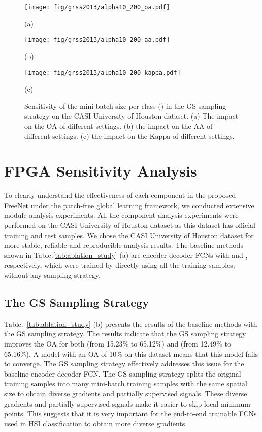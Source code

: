 \documentclass[journal]{IEEEtran}
\begin{document}
\begin{figure*}[htb]
  \begin{minipage}[b]{.32\linewidth}
    \centering
    \texttt{[image: fig/grss2013/alpha10\_200\_oa.pdf]}
    \centerline{(a)}
  \end{minipage}
  \hfill
  \begin{minipage}[b]{0.32\linewidth}
    \centering
    \texttt{[image: fig/grss2013/alpha10\_200\_aa.pdf]}
    \centerline{(b)}
  \end{minipage}
  \hfill
  \begin{minipage}[b]{0.32\linewidth}
    \centering
    \texttt{[image: fig/grss2013/alpha10\_200\_kappa.pdf]}
    \centerline{(c)}
  \end{minipage}
  \caption{Sensitivity of the mini-batch size per class () in the GS sampling strategy on the CASI University of Houston dataset.
    (a) The impact on the OA of different  settings.
    (b) the impact on the AA of different  settings.
    (c) the impact on the Kappa of different  settings.}
  \label{fig:alpha}
\end{figure*}






\section{FPGA Sensitivity Analysis}
To clearly understand the effectiveness of each component in the proposed FreeNet under the patch-free global learning framework, we conducted extensive module analysis experiments.
All the component analysis experiments were performed on the CASI University of Houston dataset as this dataset has official training and test samples.
We chose the CASI University of Houston dataset for more stable, reliable and reproducible analysis results.
The baseline methods shown in Table.\ref{tab:ablation_study} (a) are encoder-decoder FCNs with  and , respectively, which were trained by directly using all the training samples, without any sampling strategy.
\subsection{\textbf{The GS Sampling Strategy}}
\label{sec:gs2}
Table.~\ref{tab:ablation_study} (b) presents the results of the baseline methods with the GS sampling strategy.
The results indicate that the GS sampling strategy improves the OA for both  (from 15.23\% to 65.12\%) and  (from 12.49\% to 65.16\%).
A model with an OA of 10\% on this dataset means that this model fails to converge.
The GS sampling strategy effectively addresses this issue for the baseline encoder-decoder FCN.
The GS sampling strategy splits the original training samples into many mini-batch training samples with the same spatial size to obtain diverse gradients and partially supervised signals.
These diverse gradients and partially supervised signals make it easier to skip local minimum points.
This suggests that it is very important for the end-to-end trainable FCNs used in HSI classification to obtain more diverse gradients.
\end{document}
